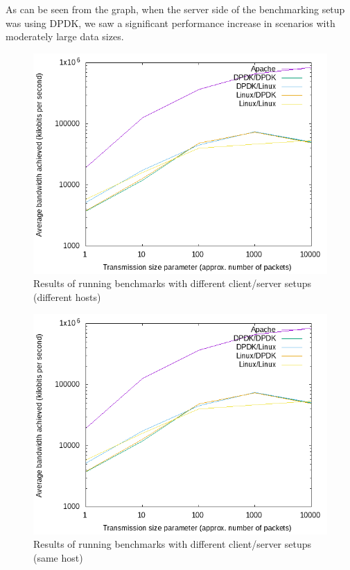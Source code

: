 \documentclass{sig-alternate-05-2015}
\begin{document}
As can be seen from the graph, when the server side of the benchmarking setup was using DPDK,
we saw a significant performance increase in scenarios with moderately large data sizes.

\begin{figure}[h]
\centering
\includegraphics[scale=0.5]{plot.png}
\caption{Results of running benchmarks with different client/server setups (different hosts)}
\label{fig:benchmark}
\end{figure}

\begin{figure}[h]
\centering
\includegraphics[scale=0.5]{plot-adj.png}
\caption{Results of running benchmarks with different client/server setups (same host)}
\label{fig:benchmark-adj}
\end{figure}
\end{document}
